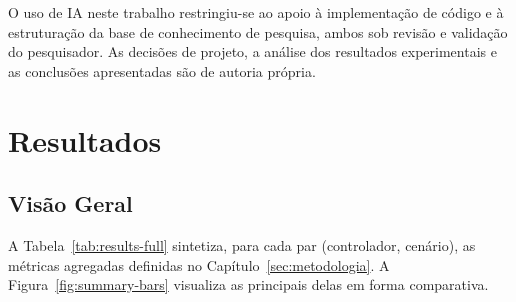 \documentclass[conference]{IEEEtran}
\begin{document}
O uso de IA neste trabalho restringiu-se ao apoio à
implementação de código e à estruturação da base de
conhecimento de pesquisa, ambos sob revisão e validação do
pesquisador. As decisões de projeto, a análise dos resultados
experimentais e as conclusões apresentadas são de autoria
própria.

\section{Resultados}\label{sec:resultados}

\subsection{Visão Geral}

A Tabela~\ref{tab:results-full} sintetiza, para cada par
(controlador, cenário), as métricas agregadas definidas no
Capítulo~\ref{sec:metodologia}. A Figura~\ref{fig:summary-bars}
visualiza as principais delas em forma comparativa.
\end{document}
